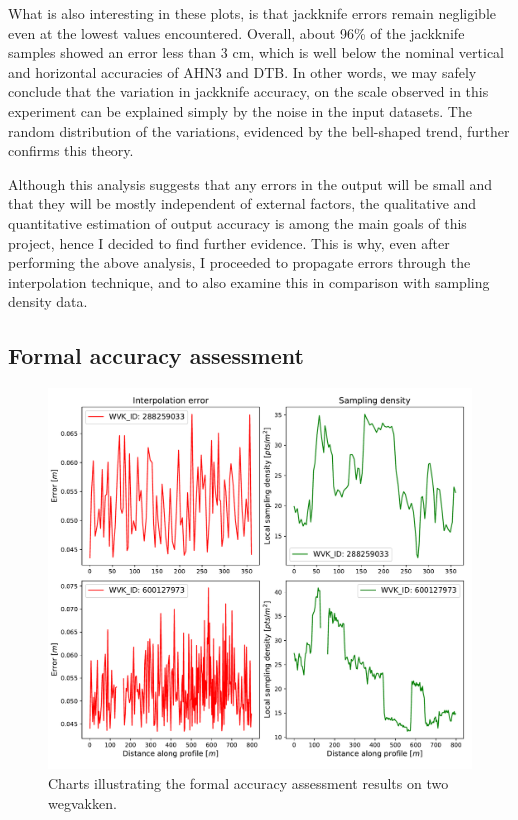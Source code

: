 What is also interesting in these plots, is that jackknife errors remain negligible even at the lowest values encountered. Overall, about 96\% of the jackknife samples showed an error less than 3 cm, which is well below the nominal vertical and horizontal accuracies of AHN3 and DTB. In other words, we may safely conclude that the variation in jackknife accuracy, on the scale observed in this experiment can be explained simply by the noise in the input datasets. The random distribution of the variations, evidenced by the bell-shaped trend, further confirms this theory.

Although this analysis suggests that any errors in the output will be small and that they will be mostly independent of external factors, the qualitative and quantitative estimation of output accuracy is among the main goals of this project, hence I decided to find further evidence. This is why, even after performing the above analysis, I proceeded to propagate errors through the interpolation technique, and to also examine this in comparison with sampling density data.

\subsection{Formal accuracy assessment}
\label{sub:accuracyformal}

\begin{figure}
    \centering
    \includegraphics[width=\linewidth]{final_report/figs/formalaccuracy0.pdf}
    \caption{Charts illustrating the formal accuracy assessment results on two wegvakken.}
    \label{fig:formalaccuracy0}
\end{figure}

